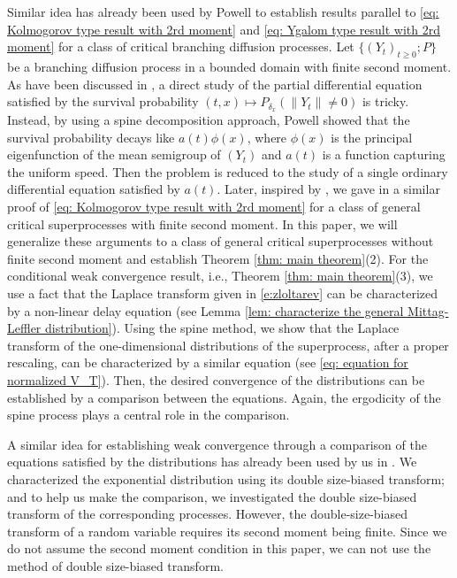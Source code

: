 \documentclass[12pt,a4paper]{amsart}
\theoremstyle{definition}
\numberwithin{equation}{section}
\begin{document}
Similar idea has already been used by Powell \cite{Powell2015An-invariance} to establish results parallel to \eqref{eq: Kolmogorov type result with 2rd moment} and \eqref{eq: Ygalom type result with 2rd moment} for a class of critical branching diffusion processes.
Let $\{(Y_t)_{t\geq 0}; P\}$ be a branching diffusion process in a bounded domain with finite second moment.
As have been discussed in \cite{Powell2015An-invariance}, a direct study of the partial differential equation satisfied by the survival probability $(t,x) \mapsto P_{\delta_x}(\|Y_t\| \neq 0)$ is tricky.
Instead, by using a spine decomposition approach, Powell \cite{Powell2015An-invariance} showed that the survival probability decays like $a(t)\phi(x)$, where $\phi(x)$ is the principal eigenfunction of the mean semigroup of $(Y_t)$ and $a(t)$ is a function capturing the uniform speed.
Then the problem is reduced to the study of a single ordinary differential equation satisfied by $a(t)$.
Later, inspired by \cite{Powell2015An-invariance}, we gave in \cite{RenSongSun2017Spine} a similar proof of \eqref{eq: Kolmogorov type result with 2rd moment} for a class of general critical superprocesses with finite second moment.
In this paper, we will  generalize these arguments to a class of general critical superprocesses without finite second moment and establish Theorem \ref{thm: main theorem}(2).
For the conditional weak convergence result, i.e., Theorem \ref{thm: main theorem}(3), we use a fact that the Laplace transform given in \eqref{e:zloltarev} can be characterized by a non-linear delay equation (see Lemma \ref{lem: characterize the general Mittag-Leffler distribution}).
Using the spine method, we show that the Laplace transform of the one-dimensional distributions of the superprocess, after a proper rescaling, can be 	characterized by a similar equation (see \eqref{eq: equation for normalized V_T}).
Then, the desired convergence of the distributions can be established by a comparison between the equations.	
Again, the ergodicity of the spine process plays a central role in the comparison.
	
A similar idea for establishing weak convergence through a comparison of the equations satisfied by the distributions has already been used by us in \cite{RenSongSun2017A-2-spine, RenSongSun2017Spine}.
We characterized the exponential distribution using its double size-biased transform; and to help us make the comparison, we investigated the double size-biased transform of the corresponding processes.
However, the double-size-biased transform of a random variable requires its second moment being finite.
Since we do not assume the second moment condition in this paper, we can not use the method of double size-biased transform.
		
\end{document}
